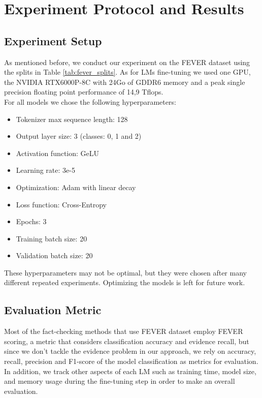 \documentclass[conference]{IEEEtran}
\begin{document}
\section{Experiment Protocol and Results}
\subsection{Experiment Setup}
As mentioned before, we conduct our experiment on the FEVER dataset using the splits in Table \ref{tab:fever_splits}. As for LMs fine-tuning we used one GPU, the NVIDIA RTX6000P-8C with 24Go of GDDR6 memory and a peak single precision floating point performance of 14,9 Tflops.\\

For all models we chose the following hyperparameters:

\begin{itemize}
\item Tokenizer max sequence length: 128
\item Output layer size: 3 (classes: 0, 1 and 2)
\item Activation function: GeLU
\item Learning rate: 3e-5
\item Optimization: Adam with linear decay
\item Loss function: Cross-Entropy
\item Epochs: 3
\item Training batch size: 20
\item Validation batch size: 20\\
\end{itemize}

These hyperparameters may not be optimal, but they were chosen after many different repeated experiments. Optimizing the models is left for future work.
\subsection{Evaluation Metric}
Most of the fact-checking methods that use FEVER dataset employ FEVER scoring\cite{thorne2018fever}, a metric that considers classification accuracy and evidence recall, but since we don't tackle the evidence problem in our approach, we rely on accuracy, recall, precision and F1-score of the model classification as metrics for evaluation.\\
In addition, we track other aspects of each LM such as training time, model size, and memory usage during the fine-tuning step in order to make an overall evaluation.
\end{document}
